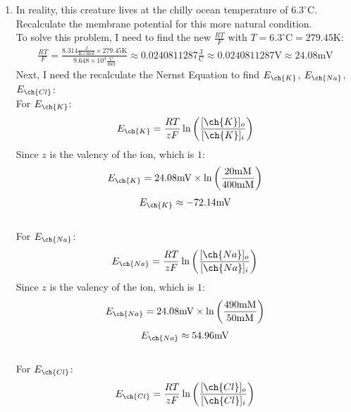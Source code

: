 \documentclass[11pt]{article}
\begin{document}
\begin{enumerate}[label=\arabic*.]
\begin{enumerate}[label=\alph*.]
\vspace*{1\baselineskip}
\item
In reality, this creature lives at the chilly ocean temperature of $6.3 ^{\circ}\text{C}$. Recalculate the membrane potential for this more natural condition. 
\vspace*{1\baselineskip}
\\
To solve this problem, I need to find the new $\frac{RT} {F}$ with $T = 6.3 ^{\circ}\text{C} = 279.45 \text{K}$:
\begin{align*}
\frac{RT} {F} = \frac{8.314 \frac{\text{J}} {\text{K} \times \text{mol}} \times 279.45 \text{K}} {9.648 \times 10 ^ 4 \frac{\text{C}} {\text{mol}}} \approx 0.0240811287 \frac{\text{J}} {\text{C}} \approx 0.0240811287 \text{V} \approx 24.08 \text{mV}
\end{align*}
Next, I need the recalculate the Nernst Equation to find $E_{\ch{K}}$, $E_{\ch{Na}}$, $E_{\ch{Cl}}$:
\vspace*{1\baselineskip}
\\
For $E_{\ch{K}}$:
\begin{align*}
E_{\ch{K}} = \frac{RT} {zF} \ln{\left(\frac{[\ch{K}]_o} {[\ch{K}]_i}\right)}
\end{align*}
Since $z$ is the valency of the  ion, which is $1$:
\begin{align*}
E_{\ch{K}} = 24.08 \text{mV} \times \ln{\left(\frac{20 \text{mM}} {400 \text{mM}}\right)}
\end{align*}
\begin{align*}
E_{\ch{K}} \approx -72.14 \text{mV}
\end{align*}
\vspace*{1\baselineskip}
\\
For $E_{\ch{Na}}$:
\begin{align*}
E_{\ch{Na}} = \frac{RT} {zF} \ln{\left(\frac{[\ch{Na}]_o} {[\ch{Na}]_i}\right)}
\end{align*}
Since $z$ is the valency of the  ion, which is $1$:
\begin{align*}
E_{\ch{Na}} = 24.08 \text{mV} \times \ln{\left(\frac{490 \text{mM}} {50 \text{mM}}\right)}
\end{align*}
\begin{align*}
E_{\ch{Na}} \approx 54.96 \text{mV}
\end{align*}
\vspace*{1\baselineskip}
\\
For $E_{\ch{Cl}}$:
\begin{align*}
E_{\ch{Cl}} = \frac{RT} {zF} \ln{\left(\frac{[\ch{Cl}]_o} {[\ch{Cl}]_i}\right)}

\end{align*}
\end{enumerate}
\end{enumerate}
\end{document}
